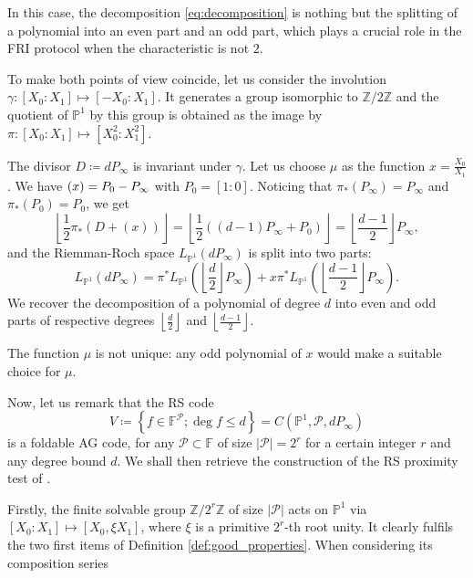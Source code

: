 \documentclass[10pt,a4paper]{article}
\newcommand\F{\mathbb{F}}
\newcommand\PP{\mathbb{P}}
\newcommand\Z{\mathbb{Z}}
\newcommand\floor[1]{\left\lfloor #1 \right\rfloor}
\let\div\relax\DeclareMathOperator{\div}{div}
\newcommand{\set}[1]{\left\{#1\right\}}
\newcommand{\size}[1]{\left|#1\right|}
\newcommand\calP{\mathcal{P}}
\newcommand\mydef{\coloneqq}
\theoremstyle{plain}
\theoremstyle{plain}
\theoremstyle{definition}
\theoremstyle{remark}
\theoremstyle{plain}
\begin{document}
In this case, the decomposition \eqref{eq:decomposition} is nothing but the splitting of a polynomial into an even part and an odd part, which plays a crucial role in the \textsf{FRI} protocol when the characteristic is not $2$.

To make both points of view coincide, let us consider the involution $\gamma :[X_0:X_1] \mapsto [-X_0 : X_1]$. It generates a group isomorphic to $\Z/2\Z$ and the quotient of $\PP^1$ by this group is obtained as the image by $\pi:[X_0:X_1]\mapsto [X_0^2:X_1^2]$.

The divisor $D\mydef d P_\infty$ is invariant under $\gamma$. Let us choose $\mu$ as the function $x= \frac{X_0}{X_1}$. We have $\div(x) = P_0 - P_\infty$ with $P_0=[1:0]$. Noticing that $\pi_*(P_\infty)=P_\infty$ and $\pi_*(P_0)=P_0$, we get
\[\floor{\frac{1}{2}\pi_*(D + (x))}=\floor{\frac{1}{2}((d-1)P_\infty + P_0)}=\floor{\frac{d-1}{2}}P_\infty,\]
and the Riemman-Roch space $L_{\PP^1}(d P_\infty)$ is split into two parts:
\[L_{\PP^1}(d P_\infty)= \pi^*L_{\PP^1}\left(\floor{\frac{d}{2}}P_\infty\right) + x \pi^*L_{\PP^1}\left(\floor{\frac{d-1}{2}}P_\infty\right).  \]
We recover the decomposition of a polynomial of degree $d$ into even and odd parts of respective degrees $\floor{\frac{d}{2}}$ and $\floor{\frac{d-1}{2}}$.

\begin{remark}
	The function $\mu$ is not unique: any odd polynomial of $x$ would make a suitable choice for $\mu$.
\end{remark}

\medskip

Now, let us remark that the RS code \[V \mydef \set{f \in \F^\calP ; \deg f \le d} = C(\PP^1, \calP, dP_\infty)\] is a foldable AG code, for any $\calP \subset \F$ of size $\size{\calP} = 2^{r}$ for a certain integer $r$ and any degree bound $d$. We shall then retrieve the construction of the RS proximity test of \cite{BBHR18a}. 

Firstly, the finite solvable group $\Z / 2^r \Z$ of size $\size{\calP}$ acts on $\PP^1$ via $[X_0:X_1] \mapsto [X_0,\xi X_1]$, where $\xi$ is a primitive $2^r$-th root unity. It clearly fulfils the two first items of Definition \ref{def:good_properties}. When considering its composition series
\end{document}
